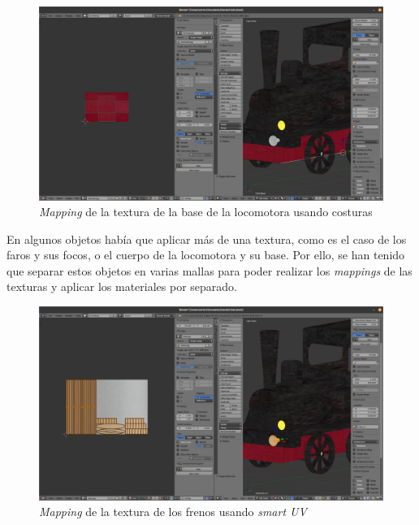 \documentclass{article}
\begin{document}
\begin{figure}[h!]
    \includegraphics[width=\textwidth]{images/seams.png}
    \caption{\textit{Mapping} de la textura de la base de la locomotora usando costuras}
    \label{fig:seams}
\end{figure}

En algunos objetos había que aplicar más de una textura, como es el caso de los
faros y sus focos, o el cuerpo de la locomotora y su base. Por ello, se han
tenido que separar estos objetos en varias mallas para poder realizar los
\textit{mappings} de las texturas y aplicar los materiales por separado.

\begin{figure}
    \includegraphics[width=\textwidth]{images/smart-uv.png}
    \caption{\textit{Mapping} de la textura de los frenos usando \textit{smart UV}}
    \label{fig:smart-uv}
\end{figure}
\end{document}

